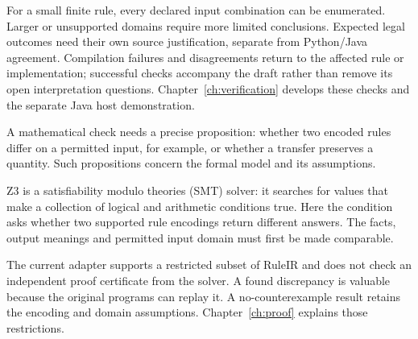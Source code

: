 For a small finite rule, every declared input combination can be enumerated.
Larger or unsupported domains require more limited conclusions. Expected legal
outcomes need their own source justification, separate from Python/Java
agreement. Compilation failures and disagreements return to the affected rule
or implementation; successful checks accompany the draft rather than remove
its open interpretation questions. Chapter~\ref{ch:verification} develops
these checks and the separate Java host demonstration.

\clearpage
{}
A mathematical check needs a precise proposition: whether two encoded rules
differ on a permitted input, for example, or whether a transfer preserves a
quantity. Such propositions concern the formal model and its assumptions.

Z3 is a satisfiability modulo theories (SMT) solver: it searches for values that
make a collection of logical and arithmetic conditions true. Here the condition
asks whether two supported rule encodings return different answers. The facts,
output meanings and permitted input domain must first be made comparable.

\begin{MapDiagram}
\end{MapDiagram}

The current adapter supports a restricted subset of RuleIR and does not check
an independent proof certificate from the solver. A found discrepancy is
valuable because the original programs can replay it. A no-counterexample
result retains the encoding and domain assumptions. Chapter~\ref{ch:proof}
explains those restrictions.

